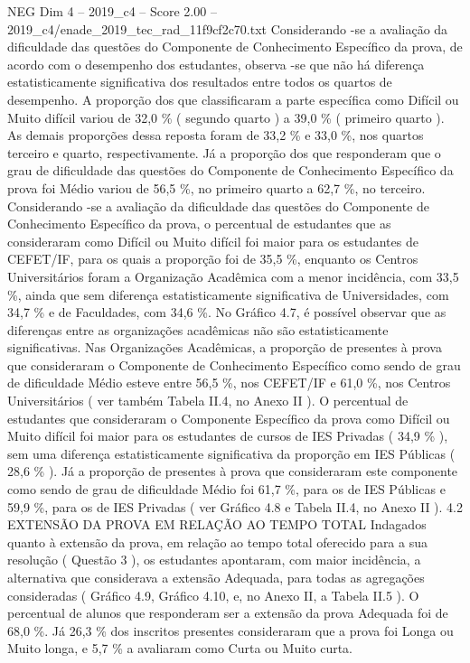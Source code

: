 \begin{textsample}{NEG Dim 4 – 2019\_c4 – Score 2.00 – 2019\_c4/enade\_2019\_tec\_rad\_11f9cf2c70.txt}
Considerando -se a avaliação da dificuldade das questões do Componente de Conhecimento Específico da prova, de acordo com o desempenho dos estudantes, observa -se que não há diferença estatisticamente significativa dos resultados entre todos os quartos de desempenho.
A proporção dos que classificaram a parte específica como Difícil ou Muito difícil variou de 32,0 \% ( segundo quarto ) a 39,0 \% ( primeiro quarto ).
As demais proporções dessa reposta foram de 33,2 \% e 33,0 \%, nos quartos terceiro e quarto, respectivamente.
Já a proporção dos que responderam que o grau de dificuldade das questões do Componente de Conhecimento Específico da prova foi Médio variou de 56,5 \%, no primeiro quarto a 62,7 \%, no terceiro.
Considerando -se a avaliação da dificuldade das questões do Componente de Conhecimento Específico da prova, o percentual de estudantes que as consideraram como Difícil ou Muito difícil foi maior para os estudantes de CEFET/IF, para os quais a proporção foi de 35,5 \%, enquanto os Centros Universitários foram a Organização Acadêmica com a menor incidência, com 33,5 \%, ainda que sem diferença estatisticamente significativa de Universidades, com 34,7 \% e de Faculdades, com 34,6 \%.
No Gráfico 4.7, é possível observar que as diferenças entre as organizações acadêmicas não são estatisticamente significativas.
Nas Organizações Acadêmicas, a proporção de presentes à prova que consideraram o Componente de Conhecimento Específico como sendo de grau de dificuldade Médio esteve entre 56,5 \%, nos CEFET/IF e 61,0 \%, nos Centros Universitários ( ver também Tabela II.4, no Anexo II ).
O percentual de estudantes que consideraram o Componente Específico da prova como Difícil ou Muito difícil foi maior para os estudantes de cursos de IES Privadas ( 34,9 \% ), sem uma diferença estatisticamente significativa da proporção em IES Públicas ( 28,6 \% ).
Já a proporção de presentes à prova que consideraram este componente como sendo de grau de dificuldade Médio foi 61,7 \%, para os de IES Públicas e 59,9 \%, para os de IES Privadas ( ver Gráfico 4.8 e Tabela II.4, no Anexo II ). 4.2 EXTENSÃO DA PROVA EM RELAÇÃO AO TEMPO TOTAL Indagados quanto à extensão da prova, em relação ao tempo total oferecido para a sua resolução ( Questão 3 ), os estudantes apontaram, com maior incidência, a alternativa que considerava a extensão Adequada, para todas as agregações consideradas ( Gráfico 4.9, Gráfico 4.10, e, no Anexo II, a Tabela II.5 ).
O percentual de alunos que responderam ser a extensão da prova Adequada foi de 68,0 \%.
Já 26,3 \% dos inscritos presentes consideraram que a prova foi Longa ou Muito longa, e 5,7 \% a avaliaram como Curta ou Muito curta.

\end{textsample}
